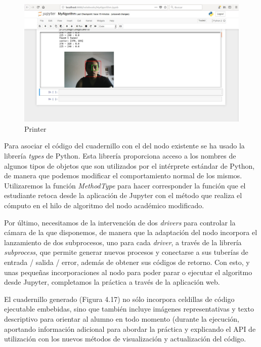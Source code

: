 \begin{figure}[H]
  \begin{center}
    \includegraphics[width=0.98\linewidth]{figures/printer.jpg}
		\caption{Printer}
		\label{fig.printer}
		\end{center}
\end{figure}

Para asociar el código del cuadernillo con el del nodo existente se ha usado la librería \textit{types} de Python. Esta librería proporciona acceso a los nombres de algunos tipos de objetos que son utilizados por el intérprete estándar de Python, de manera que podemos modificar el comportamiento normal de los mismos. Utilizaremos la función \textit{MethodType} para hacer corresponder la función que el estudiante retoca desde la aplicación de Jupyter con el método que realiza el cómputo en el hilo de algoritmo del nodo académico modificado. 

Por último, necesitamos de la intervención de dos \textit{drivers} para controlar la cámara de la que disponemos, de manera que la adaptación del nodo incorpora el lanzamiento de dos subprocesos, uno para cada \textit{driver}, a través de la librería \textit{subprocess}, que permite generar nuevos procesos y conectarse a sus tuberías de entrada / salida / error, además de obtener sus códigos de retorno. Con esto, y unas pequeñas incorporaciones al nodo para poder parar o ejecutar el algoritmo desde Jupyter, completamos la práctica a través de la aplicación web. 

El cuadernillo generado (Figura 4.17) no sólo incorpora celdillas de código ejecutable embebidas, sino que también incluye imágenes representativas y texto descriptivo para orientar al alumno en todo momento (durante la ejecución, aportando información adicional para abordar la práctica y explicando el API de utilización con los nuevos métodos de visualización y actualización del código. 


